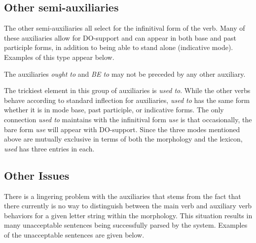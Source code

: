 \subsection{Other semi-auxiliaries}

The other semi-auxiliaries all select for the infinitival form of the verb.
Many of these auxiliaries allow for DO-support and can appear in both base and
past participle forms, in addition to being able to stand alone (indicative 
mode).  Examples of this type appear below.


The auxiliaries {\it ought to} and {\it BE to} may not be preceded by any other
auxiliary.  


The trickiest element in this group of auxiliaries is {\it used to}.  While the
other verbs behave according to standard inflection for auxiliaries, {\it used
to} has the same form whether it is in mode base, past participle, or
indicative forms.  The only connection {\it used to} maintains with the
infinitival form {\it use} is that occasionally, the bare form {\it use} will
appear with DO-support.  Since the three modes mentioned above are mutually
exclusive in terms of both the morphology and the lexicon, {\it used} has three
entries in each.  

\subsection{Other Issues}

There is a lingering problem with the auxiliaries that stems from the fact that
there currently is no way to distinguish between the main verb and auxiliary verb
behaviors for a given letter string within the morphology.  This situation
results in many unacceptable sentences being successfully parsed by the system.
Examples of the unacceptable sentences are given below.


